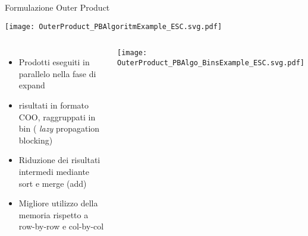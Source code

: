 \begin{frame}{Formulazione Outer Product}
\subtitle{Expand Sort Compress – propagation blocking}
\texttt{[image: OuterProduct\_PBAlgoritmExample\_ESC.svg.pdf]}
\begin{columns}
	\begin{itemize}
		\item	Prodotti eseguiti in parallelo nella fase di expand
		\item	risultati in formato COO, raggruppati in bin {\tiny( \emph{lazy} propagation blocking)}
		\pause
		\item	Riduzione dei risultati intermedi mediante sort e merge (add)
		\pause
		\item	Migliore utilizzo della memoria rispetto a row-by-row e col-by-col
	\end{itemize}
	\texttt{[image: OuterProduct\_PBAlgo\_BinsExample\_ESC.svg.pdf]}
\end{columns}
\end{frame}

